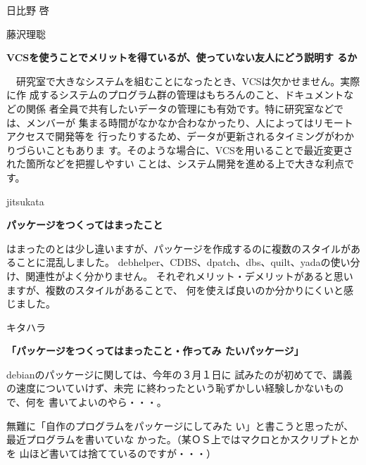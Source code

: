 \documentclass[cjk,dvipdfmx,12pt]{beamer}
\begin{document}
\begin{frame}{日比野 啓}
\end{frame}\begin{frame}{藤沢理聡}

\textbf{VCSを使うことでメリットを得ているが、使っていない友人にどう説明す
るか}

　研究室で大きなシステムを組むことになったとき、VCSは欠かせません。実際に作 
成するシステムのプログラム群の管理はもちろんのこと、ドキュメントなどの関係 
者全員で共有したいデータの管理にも有効です。特に研究室などでは、メンバーが 
集まる時間がなかなか合わなかったり、人によってはリモートアクセスで開発等を 
行ったりするため、データが更新されるタイミングがわかりづらいこともありま 
す。そのような場合に、VCSを用いることで最近変更された箇所などを把握しやすい 
ことは、システム開発を進める上で大きな利点です。

\end{frame}\begin{frame}{jitsukata}

\textbf{パッケージをつくってはまったこと}

はまったのとは少し違いますが、パッケージを作成するのに複数のスタイルがあることに混乱しました。
debhelper、CDBS、dpatch、dbs、quilt、yadaの使い分け、関連性がよく分かりません。
それぞれメリット・デメリットがあると思いますが、複数のスタイルがあることで、
何を使えば良いのか分かりにくいと感じました。

\end{frame}\begin{frame}{キタハラ}

\textbf{「パッケージをつくってはまったこと・作ってみ
たいパッケージ」}

debianのパッケージに関しては、今年の３月１日に
試みたのが初めてで、講義の速度についていけず、未完
に終わったという恥ずかしい経験しかないもので、何を
書いてよいのやら・・・。

無難に「自作のプログラムをパッケージにしてみた
い」と書こうと思ったが、最近プログラムを書いていな
かった。（某ＯＳ上ではマクロとかスクリプトとかを
山ほど書いては捨てているのですが・・・）　

\end{frame}

\end{document}
